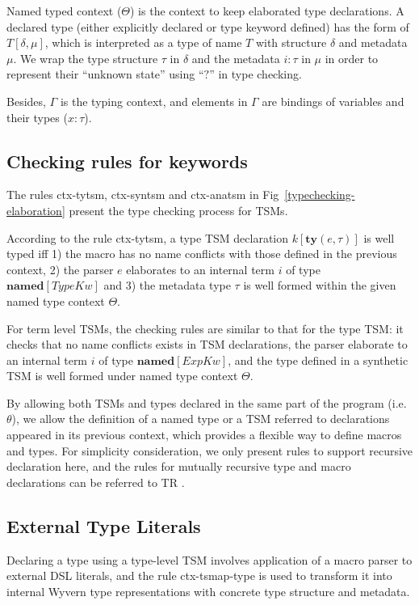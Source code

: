 \documentclass{sig-alternate}
\begin{document}
Named typed context ($\Theta$) is the context to keep elaborated type declarations. A declared type (either explicitly declared or type keyword defined) has the form of $T[\delta,\mu]$, which is interpreted as a type of name $T$ with structure $\delta$ and metadata $\mu$. We wrap the type structure $\tau$ in $\delta$ and the metadata $i:\tau$ in $\mu$ in order to represent their ``unknown state'' using ``$?$'' in type checking.

Besides, $\Gamma$ is the typing context, and elements in $\Gamma$ are bindings of variables and their types ($x:\tau$).

\subsection{Checking rules for keywords}
The rules ctx-tytsm, ctx-syntsm and ctx-anatsm in Fig~\ref{typechecking-elaboration} present the type checking process for TSMs.

According to the rule ctx-tytsm, a type TSM declaration $k[\mathbf{ty}(e,\tau)]$ is well typed iff 1) the macro has no name conflicts with those defined in the previous context, 2) the parser $e$ elaborates to an internal term $i$ of type $\mathbf{named}[TypeKw]$ and 3) the metadata type $\tau$ is well formed within the given named type context $\Theta$.

For term level TSMs, the checking rules are similar to that for the type TSM: it checks that no name conflicts exists in TSM declarations, the parser elaborate to an internal term $i$ of type $\mathbf{named}[ExpKw]$, and the type defined in a synthetic TSM is well formed under named type context $\Theta$.

By allowing both TSMs and types declared in the same part of the program (i.e. $\theta$), we allow the definition of a named type or a TSM referred to declarations appeared in its previous context, which provides a flexible way to define macros and types. For simplicity consideration, we only present rules to support recursive declaration here, and the rules for mutually recursive type and macro declarations can be referred to TR .

\subsection{External Type Literals}
Declaring a type using a type-level TSM involves application of a macro parser to external DSL literals, and the rule ctx-tsmap-type is used to transform it into internal Wyvern type representations with concrete type structure and metadata.
\end{document}
